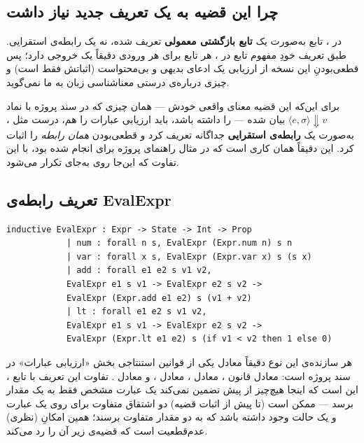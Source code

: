 \documentclass[12pt]{report}
\begin{document}
	\subsection{چرا این قضیه به یک تعریف جدید نیاز داشت}
	
	در ، تابع  به‌صورت یک \textbf{تابع بازگشتی معمولی} تعریف شده، نه یک رابطه‌ی استقرایی. طبق تعریف خودِ مفهوم تابع در ، هر تابع برای هر ورودی دقیقاً یک خروجی دارد؛ پس قطعی‌بودنِ این نسخه از ارزیابی یک ادعای بدیهی و بی‌محتواست (اثباتش فقط  است) و چیزی درباره‌ی درستی معناشناسی زبان به ما نمی‌گوید.
	
	برای این‌که این قضیه معنای واقعی خودش --- همان چیزی که در سند پروژه با نماد $\langle e,\sigma\rangle \Downarrow v$ بیان شده --- را داشته باشد، باید ارزیابی عبارات را هم، درست مثل ، به‌صورت یک \textbf{رابطه‌ی استقرایی} جداگانه تعریف کرد و قطعی‌بودن \emph{همان رابطه} را اثبات کرد. این دقیقاً همان کاری است که در مثال راهنمای پروژه برای  انجام شده بود، با این تفاوت که این‌جا روی  به‌جای  تکرار می‌شود.
	
	\subsection{تعریف رابطه‌ی EvalExpr}
	
	\begin{latin}
		\begin{lstlisting}[style=leanstyle]
			inductive EvalExpr : Expr -> State -> Int -> Prop
			| num : forall n s, EvalExpr (Expr.num n) s n
			| var : forall x s, EvalExpr (Expr.var x) s (s x)
			| add : forall e1 e2 s v1 v2,
			EvalExpr e1 s v1 -> EvalExpr e2 s v2 ->
			EvalExpr (Expr.add e1 e2) s (v1 + v2)
			| lt : forall e1 e2 s v1 v2,
			EvalExpr e1 s v1 -> EvalExpr e2 s v2 ->
			EvalExpr (Expr.lt e1 e2) s (if v1 < v2 then 1 else 0)
		\end{lstlisting}
	\end{latin}
	
	هر سازنده‌ی این نوع دقیقاً معادل یکی از قوانین استنتاجی بخش «ارزیابی عبارات» در سند پروژه است:  معادل قانون ،  معادل ،  معادل ، و  معادل . تفاوت این تعریف با تابع ، این است که اینجا هیچ‌چیز از پیش تضمین نمی‌کند یک عبارت مشخص فقط به یک مقدار برسد --- ممکن است (تا پیش از اثبات قضیه) دو اشتقاق متفاوت برای  روی یک عبارت و یک حالت وجود داشته باشد که به دو مقدار متفاوت برسند؛ همین امکانِ (نظری) عدم‌قطعیت است که قضیه‌ی زیر آن را رد می‌کند.
	
\end{document}
